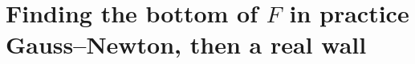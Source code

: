 
\section{\texorpdfstring{Finding the bottom of $F$ in practice\\[0.4em]{\normalsize\mdseries\color{muted} Gauss--Newton, then a real wall}}{Finding the bottom of F in practice}}

